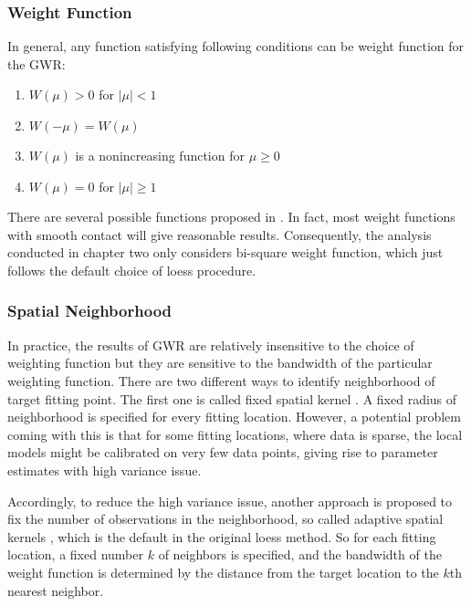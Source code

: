 \subsubsection{Weight Function}

In general, any function satisfying following conditions can be weight function
for the GWR:
\begin{enumerate}
\item $W(\mu) > 0$ for $|\mu| < 1$
\item $W(-\mu) = W(\mu)$
\item $W(\mu)$ is a nonincreasing function for $\mu \ge 0$
\item $W(\mu) = 0$ for $|\mu| \ge 1$
\end{enumerate}
There are several possible functions proposed in \cite{fotheringhamgeographically}.
In fact, most weight functions with smooth contact will give reasonable results.
Consequently, the analysis conducted in chapter two only considers bi-square
weight function, which just follows the default choice of loess procedure.

\subsubsection{Spatial Neighborhood}

In practice, the results of GWR are relatively insensitive to the choice of 
weighting function but they are sensitive to the bandwidth of the particular 
weighting function. There are two different ways to identify neighborhood of 
target fitting point. The first one is called fixed spatial kernel 
\cite{fotheringhamgeographically}. A fixed radius of neighborhood is specified
for every fitting location. 
However, a potential problem coming with this is that for some fitting locations,
where data is sparse, the local models might be calibrated on very few data points, 
giving rise to parameter estimates with high variance issue. 

Accordingly, to reduce the high variance issue, another approach is proposed to 
fix the number of observations in the neighborhood, so called adaptive spatial
kernels \cite{fotheringhamgeographically}, which is the default in the original 
loess method. So for each fitting location, a fixed number $k$ of neighbors is 
specified, and the bandwidth of the weight function is determined by the distance
from the target location to the $k$th nearest neighbor. 
